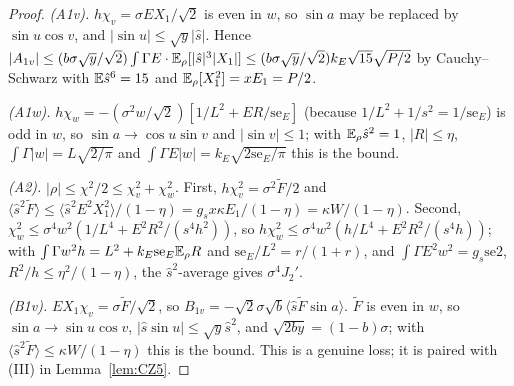 \begin{proof}
\emph{(A1v).} $h\chi_v=\sigma EX_1/\sqrt2$ is even in $w$, so $\sin a$ may be replaced by $\sin u\cos v$, and $|\sin u|\le\sqrt y|\hat s|$. Hence $|A_{1v}|\le(b\sigma\sqrt y/\sqrt2)\int\Gamma E\cdot\mathbb{E}_\rho[|\hat s|^3|X_1|]\le(b\sigma\sqrt y/\sqrt2)k_E\sqrt{15}\sqrt{P/2}$ by Cauchy--Schwarz with $\mathbb{E}\hat s^6=15$ and $\mathbb{E}_\rho[X_1^2]=xE_1=P/2$.

\emph{(A1w).} $h\chi_w=-(\sigma^2w/\sqrt2)[1/L^2+ER/\mathrm{se}_E]$ (because $1/L^2+1/s^2=1/\mathrm{se}_E$) is odd in $w$, so $\sin a\to\cos u\sin v$ and $|\sin v|\le1$; with $\mathbb{E}_\rho\hat s^2=1$, $|R|\le\eta$, $\int\Gamma|w|=L\sqrt{2/\pi}$ and $\int\Gamma E|w|=k_E\sqrt{2\mathrm{se}_E/\pi}$ this is the bound.

\emph{(A2).} $|\rho|\le\chi^2/2\le\chi_v^2+\chi_w^2$. First, $h\chi_v^2=\sigma^2\tilde F/2$ and $\langle\hat s^2\tilde F\rangle\le\langle\hat s^2E^2X_1^2\rangle/(1-\eta)=g_sx\kappa E_1/(1-\eta)=\kappa W/(1-\eta)$. Second, $\chi_w^2\le\sigma^4w^2(1/L^4+E^2R^2/(s^4h^2))$, so $h\chi_w^2\le\sigma^4w^2(h/L^4+E^2R^2/(s^4h))$; with $\int\Gamma w^2h=L^2+k_E\mathrm{se}_E\mathbb{E}_\rho R$ and $\mathrm{se}_E/L^2=r/(1+r)$, and $\int\Gamma E^2w^2=g_s\mathrm{se2}$, $R^2/h\le\eta^2/(1-\eta)$, the $\hat s^2$-average gives $\sigma^4J_2'$.

\emph{(B1v).} $EX_1\chi_v=\sigma\tilde F/\sqrt2$, so $B_{1v}=-\sqrt2\sigma\sqrt b\langle\hat s\tilde F\sin a\rangle$. $\tilde F$ is even in $w$, so $\sin a\to\sin u\cos v$, $|\hat s\sin u|\le\sqrt y\hat s^2$, and $\sqrt{2by}=(1-b)\sigma$; with $\langle\hat s^2\tilde F\rangle\le\kappa W/(1-\eta)$ this is the bound.
This is a genuine loss; it is paired with (III) in Lemma~\ref{lem:CZ5}.


\end{proof}
